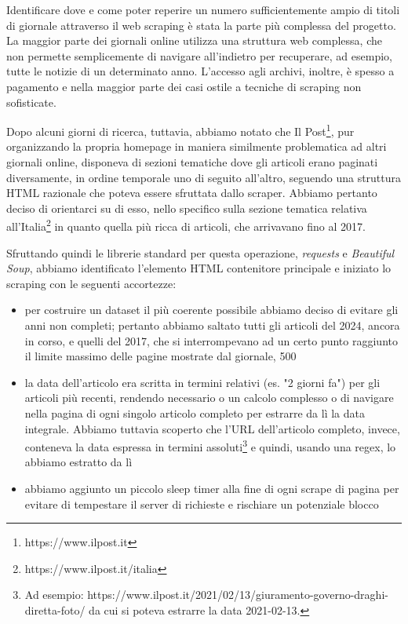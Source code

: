 \documentclass[11pt]{article}
\begin{document}
Identificare dove e come poter reperire un numero sufficientemente ampio di titoli
di giornale attraverso il web scraping è stata la parte più complessa del progetto.
La maggior parte dei giornali online utilizza una struttura web complessa, che non
permette semplicemente di navigare all'indietro per recuperare, ad esempio, tutte
le notizie di un determinato anno. L'accesso agli archivi, inoltre, è spesso a
pagamento e nella maggior parte dei casi ostile a tecniche di scraping non
sofisticate.

Dopo alcuni giorni di ricerca, tuttavia, abbiamo notato che Il Post\footnote{https://www.ilpost.it}, pur organizzando la propria homepage
in maniera similmente problematica ad altri giornali online, disponeva di sezioni
tematiche dove gli articoli erano paginati diversamente, in ordine temporale
uno di seguito all'altro, seguendo una struttura HTML razionale che poteva essere
sfruttata dallo scraper. Abbiamo pertanto deciso di orientarci su di esso, nello
specifico sulla sezione tematica relativa all'Italia\footnote{https://www.ilpost.it/italia}
in quanto quella più ricca di articoli, che arrivavano fino al 2017.

Sfruttando quindi le librerie standard per questa operazione, \textit{requests} e
\textit{Beautiful Soup}, abbiamo identificato l'elemento HTML contenitore principale e
iniziato lo scraping con le seguenti accortezze:

\begin{itemize}
\item per costruire un dataset il più coerente possibile abbiamo deciso di evitare gli anni
non completi; pertanto abbiamo saltato tutti gli articoli del 2024, ancora in corso, e
quelli del 2017, che si interrompevano ad un certo punto raggiunto il limite massimo delle
pagine mostrate dal giornale, 500
\item la data dell'articolo era scritta in termini relativi (es. "2 giorni fa") per gli
articoli più recenti, rendendo necessario o un calcolo complesso o di navigare nella pagina 
di ogni singolo articolo completo per estrarre da lì la data integrale. Abbiamo
tuttavia scoperto che l'URL dell'articolo completo, invece, conteneva la data espressa in 
termini assoluti\footnote{Ad esempio: https://www.ilpost.it/2021/02/13/giuramento-governo-draghi-diretta-foto/ da cui si poteva estrarre la data 2021-02-13.} 
e quindi, usando una regex, lo abbiamo estratto da lì
\item abbiamo aggiunto un piccolo sleep timer alla fine di ogni scrape di pagina per evitare di tempestare il server di richieste e rischiare un potenziale blocco
\end{itemize}
\end{document}
